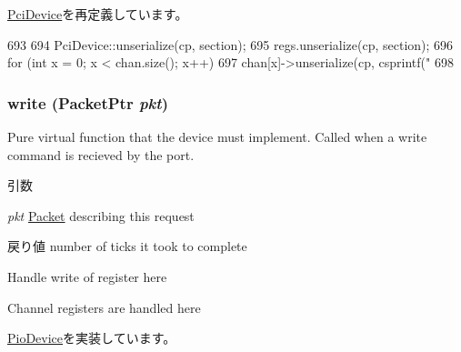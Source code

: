 \hyperlink{classPciDevice_af22e5d6d660b97db37003ac61ac4ee49}{PciDevice}を再定義しています。


\begin{DoxyCode}
693 {
694     PciDevice::unserialize(cp, section);
695     regs.unserialize(cp, section);
696     for (int x = 0; x < chan.size(); x++)
697         chan[x]->unserialize(cp, csprintf("%
698 }
\end{DoxyCode}
\hypertarget{classCopyEngine_a4cefab464e72b5dd42c003a0a4341802}{
\subsubsection[{write}]{ write ({\bf PacketPtr} {\em pkt})}}
\label{classCopyEngine_a4cefab464e72b5dd42c003a0a4341802}
Pure virtual function that the device must implement. Called when a write command is recieved by the port. 
\begin{DoxyParams}{引数}
\item[{\em pkt}]\hyperlink{classPacket}{Packet} describing this request \end{DoxyParams}
\begin{DoxyReturn}{戻り値}
number of ticks it took to complete 
\end{DoxyReturn}


Handle write of register here

Channel registers are handled here

\hyperlink{classPioDevice_afe8371668d023bb2516b286e5e399b6f}{PioDevice}を実装しています。


